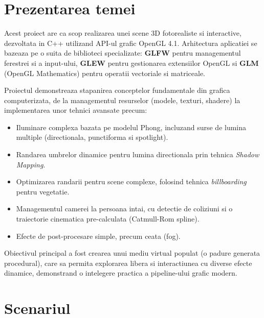 \documentclass[11pt,a4paper]{article}
\begin{document}
\section{Prezentarea temei}
Acest proiect are ca scop realizarea unei scene 3D fotorealiste si interactive, dezvoltata in C++ utilizand API-ul grafic OpenGL 4.1. Arhitectura aplicatiei se bazeaza pe o suita de biblioteci specializate: \textbf{GLFW} pentru managementul ferestrei si a input-ului, \textbf{GLEW} pentru gestionarea extensiilor OpenGL si \textbf{GLM} (OpenGL Mathematics) pentru operatii vectoriale si matriceale.

Proiectul demonstreaza stapanirea conceptelor fundamentale din grafica computerizata, de la managementul resurselor (modele, texturi, shadere) la implementarea unor tehnici avansate precum:
\begin{itemize}
    \item Iluminare complexa bazata pe modelul Phong, incluzand surse de lumina multiple (directionala, punctiforma si spotlight).
    \item Randarea umbrelor dinamice pentru lumina directionala prin tehnica \textit{Shadow Mapping}.
    \item Optimizarea randarii pentru scene complexe, folosind tehnica \textit{billboarding} pentru vegetatie.
    \item Managementul camerei la persoana intai, cu detectie de coliziuni si o traiectorie cinematica pre-calculata (Catmull-Rom spline).
    \item Efecte de post-procesare simple, precum ceata (fog).
\end{itemize}

Obiectivul principal a fost crearea unui mediu virtual populat (o padure generata procedural), care sa permita explorarea libera si interactiunea cu diverse efecte dinamice, demonstrand o intelegere practica a pipeline-ului grafic modern.

\section{Scenariul}
\end{document}
